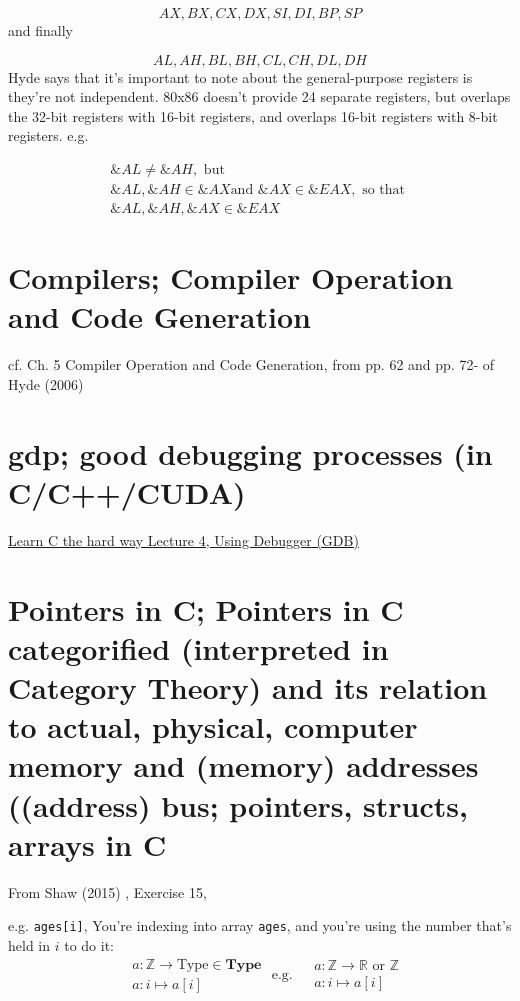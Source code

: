 \documentclass[10pt]{amsart}
\begin{document}
\[
AX, BX, CX, DX, SI, DI, BP, SP
\]
and finally 

\[
AL, AH, BL, BH, CL, CH, DL, DH
\]
Hyde says that it's important to note about the general-purpose registers is they're not independent.  80x86 doesn't provide 24 separate registers, but overlaps the 32-bit registers with 16-bit registers, and overlaps 16-bit registers with 8-bit registers.  e.g.

\[
\begin{gathered}
\&AL \neq \&AH, \text{ but } \\
\&AL, \&AH \in \&AX \text{and } \&AX \in \&EAX, \text{ so that } \\
\&AL , \&AH, \&AX \in \&EAX
\end{gathered}
\]

\section{Compilers; Compiler Operation and Code Generation}

cf. Ch. 5 Compiler Operation and Code Generation, from pp. 62 and pp. 72- of Hyde (2006) \cite{Hyde2006}





\section{gdp; good debugging processes (in C/C++/CUDA)}

\href{https://youtu.be/heEaKf2b1uA}{Learn C the hard way Lecture 4, Using Debugger (GDB) }


\section{Pointers in C; Pointers in C categorified (interpreted in Category Theory) and its relation to actual, physical, computer memory and (memory) addresses ((address) bus; pointers, structs, arrays in C}

From Shaw (2015) \cite{Shaw2015}, Exercise 15, 

e.g. \verb|ages[i]|, You're indexing into array \verb|ages|, and you're using the number that's held in $i$ to do it:  
\[
\begin{aligned}
& a : \mathbb{Z} \to \text{Type} \in \textbf{Type}  \\
& a: i \mapsto a[i]
\end{aligned} \text{ e.g. } 
\begin{aligned}
& a: \mathbb{Z} \to \mathbb{R} \text{ or } \mathbb{Z}  \\
& a:i \mapsto a[i]
\end{aligned}
\]
\end{document}
